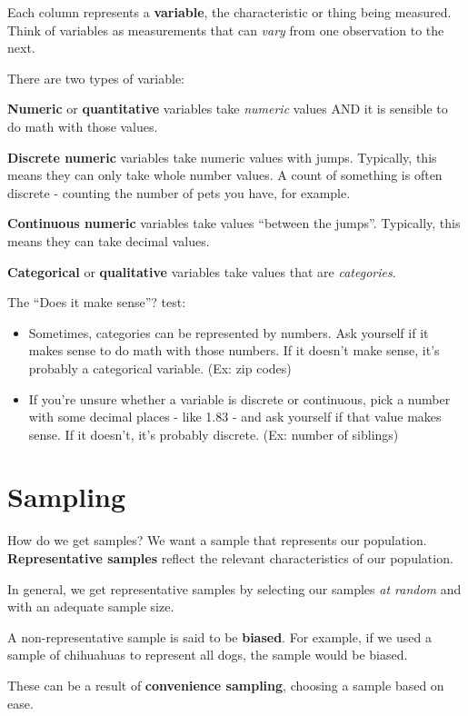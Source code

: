 \documentclass[
]{book}
\providecommand{\tightlist}{%
  \setlength{\itemsep}{0pt}\setlength{\parskip}{0pt}}
\begin{document}
Each column represents a \textbf{variable}, the characteristic or thing being measured. Think of variables as measurements that can \emph{vary} from one observation to the next.

There are two types of variable:

\textbf{Numeric} or \textbf{quantitative} variables take \emph{numeric} values AND it is sensible to do math with those values.

\textbf{Discrete numeric} variables take numeric values with jumps. Typically, this means they can only take whole number values. A count of something is often discrete - counting the number of pets you have, for example.

\textbf{Continuous numeric} variables take values ``between the jumps''. Typically, this means they can take decimal values.

\textbf{Categorical} or \textbf{qualitative} variables take values that are \emph{categories}.

The ``Does it make sense''? test:

\begin{itemize}
\tightlist
\item
  Sometimes, categories can be represented by numbers. Ask yourself if it makes sense to do math with those numbers. If it doesn't make sense, it's probably a categorical variable. (Ex: zip codes)
\item
  If you're unsure whether a variable is discrete or continuous, pick a number with some decimal places - like 1.83 - and ask yourself if that value makes sense. If it doesn't, it's probably discrete. (Ex: number of siblings)
\end{itemize}

\hypertarget{sampling}{%
\section{Sampling}\label{sampling}}

How do we get samples? We want a sample that represents our population. \textbf{Representative samples} reflect the relevant characteristics of our population.

In general, we get representative samples by selecting our samples \emph{at random} and with an adequate sample size.

A non-representative sample is said to be \textbf{biased}. For example, if we used a sample of chihuahuas to represent all dogs, the sample would be biased.

These can be a result of \textbf{convenience sampling}, choosing a sample based on ease.
\end{document}
